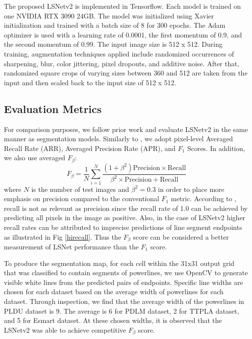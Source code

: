\documentclass[journal]{IEEEtran}
\begin{document}
The proposed LSNetv2 is implemented in Tensorflow. Each model is trained on one NVIDIA RTX 3090 24GB. The model was initialized using Xavier initialization \cite{xavier} and trained with a batch size of 8 for 300 epochs. The Adam optimizer \cite{adam} is used with a learning rate of 0.0001, the first momentum of 0.9, and the second momentum of 0.99. The input image size is 512 x 512. During training, augmentation techniques applied include randomized occurrences of sharpening, blur, color jittering, pixel dropouts, and additive noise. After that, randomized square crops of varying sizes between 360 and 512 are taken from the input and then scaled back to the input size of 512 x 512.

\subsection{Evaluation Metrics}\label{evaluation_metrics}
For comparison purposes, we follow prior work \cite{XX, XX} and evaluate LSNetv2 in the same manner as segmentation models.
Similarly to \cite{Nguyen2020}, we adopt pixel-level Averaged Recall Rate (ARR), Averaged Precision Rate (APR), and $F_1$ Scores. In addition, we also use averaged $F_{\beta}$:
\begin{equation}
  F_{\beta} = \frac{1}{N} \sum_{i=1}^N  \frac{(1 + \beta^2)\text{Precision} \times \text{Recall}}{\beta^2 \times \text{Precision} + \text{Recall}} 
\end{equation}
where $N$ is the number of test images and $\beta^2 = 0.3$ in order to place more emphasis on precision compared to the conventional $F_1$ metric. According to \cite{f_beta0, f_beta1}, recall is not as relevant as precision since the recall rate of 1.0 can be achieved by predicting all pixels in the image as positive. Also, in the case of LSNetv2 higher recall rates can be attributed to imprecise predictions of line segment endpoints as illustrated in Fig \ref{hirecall}. Thus the $F_{\beta}$ score can be considered a better measurement of LSNet performance than the $F_1$ score.

To produce the segmentation map, for each cell within the 31x31 output grid that was classified to contain segments of powerlines, we use OpenCV to generate visible white lines from the predicted pairs of endpoints. Specific line widths are chosen for each dataset based on the average width of powerlines for each dataset. Through inspection, we find that the average width of the powerlines in PLDU dataset is 9. The average is 6 for PDLM dataset, 2 for TTPLA dataset, and 5 for Esmart dataset. At these chosen widths, it is observed that the LSNetv2 was able to achieve competitive $F_{\beta}$ score.
\end{document}
